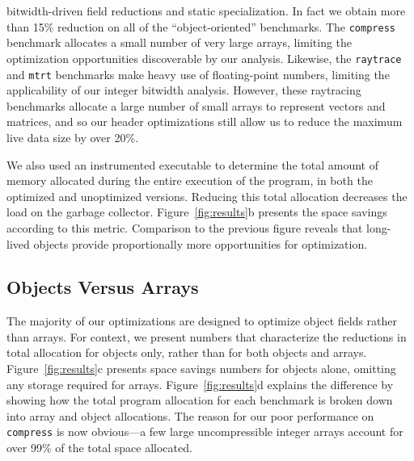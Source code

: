 \documentclass{acmconf}
\begin{document}
bitwidth-driven field reductions and static specialization.  In fact
we obtain more than 15\% reduction on all of the ``object-oriented''
benchmarks.  The {\tt compress} benchmark allocates a small
number of very large arrays, limiting the optimization opportunities
discoverable by our analysis.  Likewise, the {\tt raytrace} and
{\tt mtrt} benchmarks make heavy use of floating-point numbers,
limiting the applicability of our integer bitwidth analysis.
However, these raytracing benchmarks allocate a large number
of small arrays to represent vectors and matrices, and so our header
optimizations still allow us to reduce the maximum live data size by
over 20\%.

We also used an instrumented executable to determine the total amount
of memory allocated during the entire execution of the program, in
both the optimized and unoptimized versions.  Reducing this total
allocation decreases the load on the garbage collector.
Figure~\ref{fig:results}b presents the space savings according to this
metric.  Comparison to the previous figure reveals that
long-lived objects provide proportionally more opportunities for
optimization.
%
\subsection{Objects Versus Arrays}
%
The majority of our optimizations are designed to optimize
object fields rather than arrays. For context, we present numbers 
that characterize the reductions in total allocation for objects only,
rather than for both objects and arrays. Figure~\ref{fig:results}c
presents space savings numbers for objects alone, omitting
any storage required for arrays.
Figure~\ref{fig:results}d explains the difference by showing how the total
program allocation for each benchmark is broken down into array and
object allocations.
The reason for our poor performance on {\tt compress} is now
  obvious---a few large uncompressible integer arrays
  account for over 99\% of the total space allocated.
%
\end{document}
